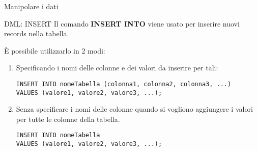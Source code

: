 \begin{frame}{Manipolare i dati}
\end{frame}
%
\begin{frame}[fragile]{DML: INSERT}
Il comando \textbf{INSERT INTO} viene usato per inserire nuovi records nella tabella.

\`E possibile utilizzarlo in 2 modi:
\begin{enumerate}
\item Specificando i nomi delle colonne e dei valori da inserire per tali:
\begin{lstlisting}
INSERT INTO nomeTabella (colonna1, colonna2, colonna3, ...)
VALUES (valore1, valore2, valore3, ...);
\end{lstlisting}
\item Senza specificare i nomi delle colonne quando si vogliono aggiungere i valori per tutte le colonne della tabella.
\begin{lstlisting}
INSERT INTO nomeTabella
VALUES (valore1, valore2, valore3, ...);
\end{lstlisting}
\end{enumerate}
\end{frame}
%

